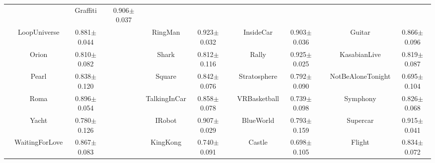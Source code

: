 \documentclass[10pt,journal,compsoc]{IEEEtran}
\begin{document}
\begin{table}
\begin{center}
{\begin{tabular}{*{4}{|c|c|c}|}
& & Graffiti & 0.906$\pm$0.037

\\
   

 & LoopUniverse & 0.881$\pm$0.044

& & RingMan & 0.923$\pm$0.032

& & InsideCar & 0.903$\pm$0.036

& & Guitar & 0.866$\pm$0.096

\\
   

 & Orion & 0.810$\pm$0.082

& & Shark & 0.812$\pm$0.116

& & Rally & 0.925$\pm$0.025

& & KasabianLive & 0.819$\pm$0.087

\\
   

 & Pearl & 0.838$\pm$0.120

& & Square & 0.842$\pm$0.076

& & Stratosphere & 0.792$\pm$0.090

& & NotBeAloneTonight & 0.695$\pm$0.104

\\
   

 & Roma & 0.896$\pm$0.054

& & TalkingInCar & 0.858$\pm$0.078

& & VRBasketball & 0.739$\pm$0.098

& & Symphony & 0.826$\pm$0.068
 \\
  \hline
  & Yacht & 0.780$\pm$0.126
&
  & IRobot & 0.907$\pm$0.029
&
  & BlueWorld & 0.793$\pm$0.159
&
  & Supercar & 0.915$\pm$0.041
\\
   

 & WaitingForLove & 0.867$\pm$0.083

& & KingKong & 0.740$\pm$0.091

& & Castle & 0.698$\pm$0.105

& & Flight & 0.834$\pm$0.072

\\
   


\end{tabular}}
\end{center}
\end{table}
\end{document}
